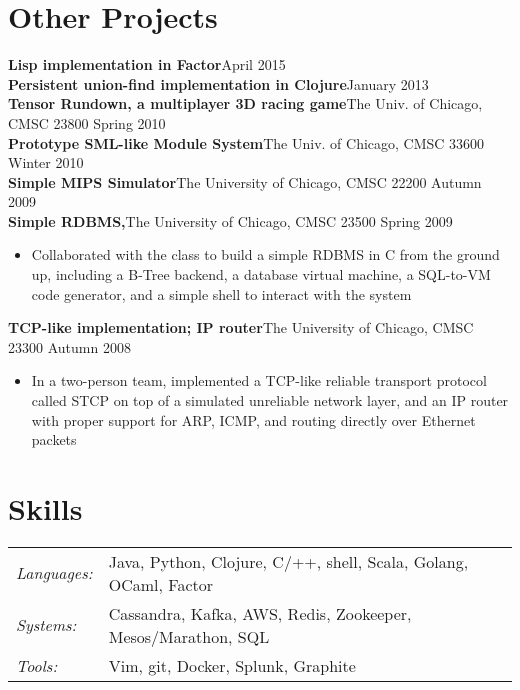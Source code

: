 \documentclass[line,overlapped]{res}
\begin{document}
\begin{resume}
\section{Other Projects}
{\bf Lisp implementation in Factor}\footnotemark[2] \hfill April 2015\\
{\bf Persistent union-find implementation in Clojure}\footnotemark[2] \hfill January 2013\\
{\bf Tensor Rundown, a multiplayer 3D racing game}\footnotemark[2] The Univ. of Chicago, CMSC 23800 \hfill Spring 2010\\
{\bf Prototype SML-like Module System}\footnotemark[2] The Univ. of Chicago, CMSC 33600 \hfill Winter 2010\\
{\bf Simple MIPS Simulator}\footnotemark[2] The University of Chicago, CMSC 22200 \hfill Autumn 2009\\
{\bf Simple RDBMS,}\footnotemark[2] The University of Chicago, CMSC 23500 \hfill Spring 2009
\begin{itemize} \itemsep -2pt
    \item Collaborated with the class to build a simple RDBMS in C from the ground up, including a B-Tree backend, a database virtual machine, a SQL-to-VM code generator, and a simple shell to interact with the system
\end{itemize}
\vspace{-10pt}
{\bf TCP-like implementation; IP router}\footnotemark[2] The University of Chicago, CMSC 23300 \hfill Autumn 2008
\begin{itemize} \itemsep -2pt
    \item In a two-person team, implemented a TCP-like reliable transport protocol called STCP on top of a simulated unreliable network layer, and an IP router with proper support for ARP, ICMP, and routing directly over Ethernet packets
\end{itemize}


\section{Skills}
   \begin{tabular}{l p{4in}}
   {\sl Languages:}&Java, Python, Clojure, C/++, shell, Scala, Golang, OCaml, Factor\\
   {\sl Systems:}&Cassandra, Kafka, AWS, Redis, Zookeeper, Mesos/Marathon, SQL\\
   {\sl Tools:}&Vim, git, Docker, Splunk, Graphite \\
 \end{tabular}

\end{resume}
\end{document}
